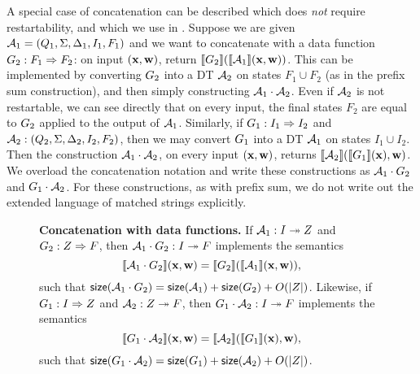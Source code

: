A special case of concatenation can be described which does \emph{not} require restartability, and which we use in . Suppose we are given $\mathcal{A}_1 = (Q_{1}, \Sigma, \Delta_{1}, I_{1}, F_{1})$ and we want to concatenate with a data function $G_2: F_1 \Rightarrow F_2$: on input $(\mathbf{x}, \mathbf{w})$, return $\llbracket G_2 \rrbracket(\llbracket \mathcal{A}_1 \rrbracket(\mathbf{x},\mathbf{w}))$. This can be implemented by converting $G_2$ into a DT $\mathcal{A}_2$ on states $F_1 \cup F_2$ (as in the prefix sum construction), and then simply constructing $\mathcal{A}_1 \cdot \mathcal{A}_2$. Even if $\mathcal{A}_2$ is not restartable, we can see directly that on every input, the final states $F_2$ are equal to $G_2$ applied to the output of $\mathcal{A}_1$.
Similarly, if $G_1: I_1 \Rightarrow I_2$ and $\mathcal{A}_2: (Q_{2}, \Sigma, \Delta_{2}, I_{2}, F_{2})$, then we may convert $G_1$ into a DT $\mathcal{A}_1$ on states $I_1 \cup I_2$. Then the construction $\mathcal{A}_1 \cdot \mathcal{A}_2$, on every input $(\mathbf{x},\mathbf{w})$, returns $\llbracket \mathcal{A}_2 \rrbracket(\llbracket G_1 \rrbracket(\mathbf{x}),\mathbf{w})$.
We overload the concatenation notation and write these constructions as $\mathcal{A}_1 \cdot G_2$ and $G_1 \cdot \mathcal{A}_2$. For these constructions, as with prefix sum, we do not write out the extended language of matched strings explicitly.

\begin{figure}[H]
\begin{dtbox}
\textbf{Concatenation with data functions.}
If $\mathcal{A}_1: I \twoheadrightarrow Z$ and $G_2: Z \Rightarrow F$, then $\mathcal{A}_1 \cdot G_2 : I \twoheadrightarrow F$ implements the semantics
\[
\llbracket \mathcal{A}_1 \cdot G_2 \rrbracket(\mathbf{x},\mathbf{w}) = \llbracket G_2 \rrbracket(\llbracket \mathcal{A}_1 \rrbracket(\mathbf{x},\mathbf{w})),
\]
such that $\mathsf{size}(\mathcal{A}_1 \cdot G_2) = \mathsf{size}(\mathcal{A}_1) + \mathsf{size}(G_2) + O(|Z|)$.
Likewise, if $G_1: I \Rightarrow Z$ and $\mathcal{A}_2: Z \twoheadrightarrow F$, then
$G_1 \cdot \mathcal{A}_2 : I \twoheadrightarrow F$ implements the semantics
\[
\llbracket G_1 \cdot \mathcal{A}_2 \rrbracket(\mathbf{x},\mathbf{w}) =
\llbracket \mathcal{A}_2 \rrbracket(\llbracket G_1 \rrbracket(\mathbf{x}),\mathbf{w}),
\]
such that $\mathsf{size}(G_1 \cdot \mathcal{A}_2) = \mathsf{size}(G_1) + \mathsf{size}(\mathcal{A}_2) + O(|Z|)$.
\end{dtbox}

\label{dt:fig:concatenation-with-DF}
\end{figure}

